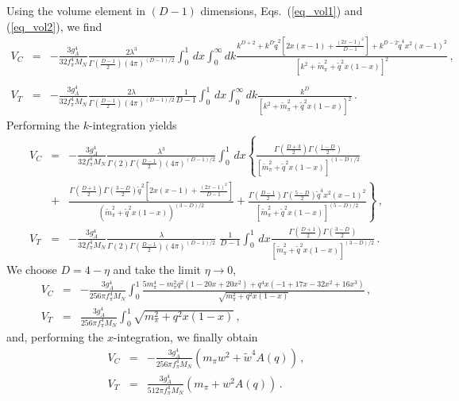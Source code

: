 \documentclass[sort&compress,preprint,3p]{elsarticle}
\begin{document}
Using the volume element in $(D-1)$ dimensions, Eqs.~(\ref{eq_vol1}) and (\ref{eq_vol2}), we find
\begin{eqnarray}
V_C &=&
- \frac{3g_A^4}{32 f_\pi^4 M_N}
\frac{2\lambda^3}{\Gamma(\frac{D-1}{2})(4 \pi)^{(D-1)/2}}
\int _0^1\,dx \int_0^\infty dk
\frac{k^{D+2} +k^D\tilde q^2\left[ 2x(x-1)+\frac{(2x-1)^2}{D-1} \right]+
k^{D-2}\tilde q^4x^2(x-1)^2 
}
{[k^2 + \tilde m_\pi^2+\tilde q^2 x(1-x)]^2}
\,,
\nonumber 
\\   \\
V_T &=& - \frac{3g_A^4}{32 f_\pi^4 M_N}
\frac{2\lambda}{\Gamma(\frac{D-1}{2})(4 \pi)^{(D-1)/2}}
\frac{1}{D-1}
\int _0^1\,dx \int_0^\infty dk
\frac{k^D}{[k^2 + \tilde m_\pi^2+\tilde q^2 x(1-x)]^2}
\,.
\end{eqnarray}
Performing the $k$-integration yields
\begin{eqnarray}
V_C &=&
- \frac{3g_A^4}{32 f_\pi^4 M_N}
\frac{\lambda^3}{\Gamma(2)\Gamma(\frac{D-1}{2})(4 \pi)^{(D-1)/2}}
\int _0^1\,dx \left\{
\frac{\Gamma(\frac{D+3}{2})\Gamma(\frac{1-D}{2})}{[\tilde m_\pi^2+\tilde q^2 x(1-x)]^{(1-D)/2}} 
\nonumber \right. \\ & + & \left .
\frac{\Gamma(\frac{D+1}{2})\Gamma(\frac{3-D}{2}) \tilde q^2\left[ 2x(x-1)+\frac{(2x-1)^2}{D-1} \right]}{(\tilde m_\pi^2+\tilde q^2 x(1-x))^{(3-D)/2}} +
\frac{\Gamma(\frac{D-1}{2})\Gamma(\frac{5-D}{2})\tilde q^4x^2(x-1)^2 }{[\tilde m_\pi^2+\tilde q^2 x(1-x)]^{(5-D)/2}} 
\right\}
\,,
\\ 
V_T &=& - \frac{3g_A^4}{32 f_\pi^4 M_N}
\frac{\lambda}{\Gamma(2)\Gamma(\frac{D-1}{2})(4 \pi)^{(D-1)/2}}
\;
\frac{1}{D-1}
\int _0^1\,dx 
\frac{\Gamma(\frac{D+1}{2})\Gamma(\frac{3-D}{2})}{[\tilde m_\pi^2+\tilde q^2 x(1-x)]^{(3-D)/2}} 
\,.
\end{eqnarray}
We choose $D=4-\eta$ and take the limit $\eta \to 0$,
\begin{eqnarray}
V_C &=& - \frac{3g_A^4}{256 \pi f_\pi^4 M_N} \int_0^1 
\frac{5m_\pi^4-m_\pi^2q^2(1-20x+20x^2)+q^4x(-1+17x-32x^2+16x^3)}{\sqrt{m_\pi^2+q^2x(1-x)}}
\,,
\\
V_T &=& \frac{3g_A^4}{256 \pi f_\pi^4 M_N}  \int_0^1 \sqrt{m_\pi^2+q^2x(1-x)}
\,,
\end{eqnarray}
and, performing the $x$-integration, we finally obtain
\begin{eqnarray}
V_C &=& - \frac{3g_A^4}{256 \pi f_\pi^4 M_N} (
m_\pi w^2 + \widetilde w^4 A(q) )
\,,
\\
V_T &=& \frac{3g_A^4}{512 \pi f_\pi^4 M_N}  (m_\pi + w^2 A(q) )
\,.
\end{eqnarray}
\end{document}
